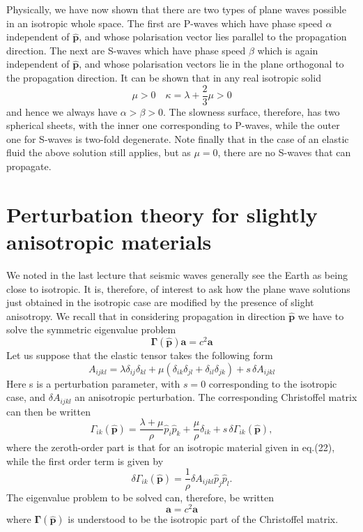 \documentclass [a4paper,12pt]{paper}
\begin{document}
Physically, we have now shown that there are two types of plane waves possible in an isotropic whole space. The first 
are P-waves which have phase speed $\alpha$
independent of $\hat{\mathbf{p}}$, and whose polarisation vector lies parallel
to the propagation direction. The next are S-waves which have phase speed $\beta$ which is again independent of $\hat{\mathbf{p}}$, and 
whose polarisation vectors  lie in the plane orthogonal to the propagation direction. It can be shown
 that in any real isotropic solid
\begin{equation}
\mu>0 \quad \kappa=\lambda+\frac{2}{3}\mu>0
\end{equation}
and hence we always have $\alpha>\beta>0$. The slowness surface, therefore, has two spherical sheets, with the inner one corresponding to 
P-waves, while the outer one for S-waves is two-fold degenerate. Note finally that in the case of
an elastic fluid the above solution still applies, but as $\mu=0$, there are no S-waves that can propagate.

\section*{Perturbation theory for slightly anisotropic materials}

We noted in the last lecture that seismic waves generally see the Earth as being close to isotropic. It is, therefore, of interest to 
ask how the plane wave solutions just obtained in the isotropic case are modified by the presence of
 slight anisotropy. We recall that in considering propagation in direction $\hat{\mathbf{p}}$ we have to solve the symmetric eigenvalue problem
\begin{equation}
\bm{\Gamma}(\hat{\mathbf{p}})\mathbf{a}=c^{2}\mathbf{a}
\end{equation}
Let us suppose that the elastic tensor takes the following form
\begin{equation}
A_{ijkl}=\lambda\delta_{ij}\delta_{kl}+\mu(\delta_{ik}\delta_{jl}+\delta_{il}\delta_{jk})+s\,\delta A_{ijkl}
\end{equation}
Here s is a perturbation parameter, with $s=0$ corresponding to the isotropic case, and $\delta A_{ijkl}$ an anisotropic perturbation. 
The corresponding Christoffel matrix can then be written
\begin{equation}
\Gamma_{ik}(\hat{\mathbf{p}})=\frac{\lambda+\mu}{\rho}\hat{p}_{i}\hat{p}_{k}+\frac{\mu}{\rho}\delta_{ik}+s\,\delta\Gamma_{ik}(\hat{\mathbf{p}}),
\end{equation}
where the zeroth-order part is that for an isotropic material given in eq.(22), while the first order term is given by
\begin{equation}
\delta\Gamma_{ik}(\hat{\mathbf{p}})=\frac{1}{\rho}\delta A_{ijkl}\hat{p}_{j}\hat{p}_{l}.
\end{equation}
The eigenvalue problem to be solved can, therefore, be written
\begin{equation}
[\bm{\Gamma}(\hat{\mathbf{p}})+s\,\delta\bm{\Gamma}(\hat{\mathbf{p}})]\mathbf{a}=c^{2}\mathbf{a}
\end{equation}
where $\bm{\Gamma}(\hat{\mathbf{p}})$ is understood to be the isotropic part of the Christoffel matrix. 
\end{document}
